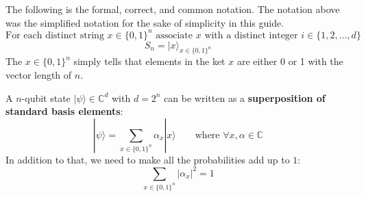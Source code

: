 The following is the formal, correct, and common notation. The notation above was the simplified notation for the sake of simplicity in this guide.
\begin{equation}
    \text{For each distinct string }
    x \in \{0, 1\}^n
    \text{ associate }x\text{ with a distinct integer }
    i \in \{1,2,\dots,d\}
\end{equation}
\begin{equation}
    S_n = {|x\rangle}_{x \in \{0,1\}^n}
\end{equation}
The $x \in \{0,1\}^n$ simply tells that elements in the ket $x$ are either 0 or 1 with the vector length of $n$. 

A $n$-qubit state $|\psi\rangle \in \mathbb{C}^d$ with $d=2^n$ can be written as a \textbf{superposition of standard basis elements}:
\begin{equation}
    |\psi\rangle
    = \sum_{{x\in\{0,1\}}^n} \alpha_x |x\rangle
    \qquad
    \text{where } \forall x,\alpha \in \mathbb{C}
\end{equation}
In addition to that, we need to make all the probabilities add up to $1$:
\begin{equation}
    \sum_{{x\in\{0,1\}}^n} |\alpha_x|^2 = 1
\end{equation}

